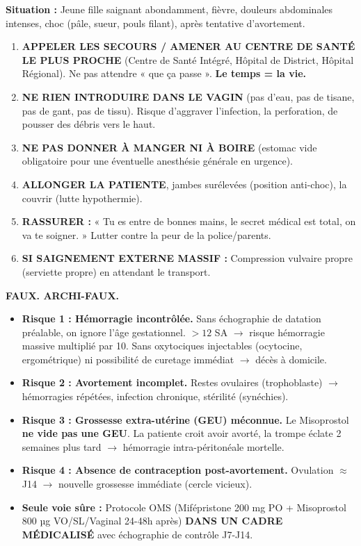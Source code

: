 \documentclass[11pt]{article}
\begin{document}
\begin{methode}
\textbf{Situation :} Jeune fille saignant abondamment, fièvre, douleurs abdominales intenses, choc (pâle, sueur, pouls filant), après tentative d'avortement.
\begin{enumerate}
    \item \textbf{APPELER LES SECOURS / AMENER AU CENTRE DE SANTÉ LE PLUS PROCHE} (Centre de Santé Intégré, Hôpital de District, Hôpital Régional). Ne pas attendre « que ça passe ». \textbf{Le temps = la vie.}
    \item \textbf{NE RIEN INTRODUIRE DANS LE VAGIN} (pas d'eau, pas de tisane, pas de gant, pas de tissu). Risque d'aggraver l'infection, la perforation, de pousser des débris vers le haut.
    \item \textbf{NE PAS DONNER À MANGER NI À BOIRE} (estomac vide obligatoire pour une éventuelle anesthésie générale en urgence).
    \item \textbf{ALLONGER LA PATIENTE}, jambes surélevées (position anti-choc), la couvrir (lutte hypothermie).
    \item \textbf{RASSURER :} « Tu es entre de bonnes mains, le secret médical est total, on va te soigner. » Lutter contre la peur de la police/parents.
    \item \textbf{SI SAIGNEMENT EXTERNE MASSIF :} Compression vulvaire propre (serviette propre) en attendant le transport.
\end{enumerate}
\end{methode}

\begin{attention}
\textbf{FAUX. ARCHI-FAUX.}
\begin{itemize}
    \item \textbf{Risque 1 : Hémorragie incontrôlée.} Sans échographie de datation préalable, on ignore l'âge gestationnel. $> 12$ SA $\to$ risque hémorragie massive multiplié par 10. Sans oxytociques injectables (ocytocine, ergométrique) ni possibilité de curetage immédiat $\to$ décès à domicile.
    \item \textbf{Risque 2 : Avortement incomplet.} Restes ovulaires (trophoblaste) $\to$ hémorragies répétées, infection chronique, stérilité (synéchies).
    \item \textbf{Risque 3 : Grossesse extra-utérine (GEU) méconnue.} Le Misoprostol \textbf{ne vide pas une GEU}. La patiente croit avoir avorté, la trompe éclate 2 semaines plus tard $\to$ hémorragie intra-péritonéale mortelle.
    \item \textbf{Risque 4 : Absence de contraception post-avortement.} Ovulation $\approx$ J14 $\to$ nouvelle grossesse immédiate (cercle vicieux).
    \item \textbf{Seule voie sûre :} Protocole OMS (Mifépristone 200 mg PO + Misoprostol 800 µg VO/SL/Vaginal 24-48h après) \textbf{DANS UN CADRE MÉDICALISÉ} avec échographie de contrôle J7-J14.
\end{itemize}
\end{attention}
\end{document}
